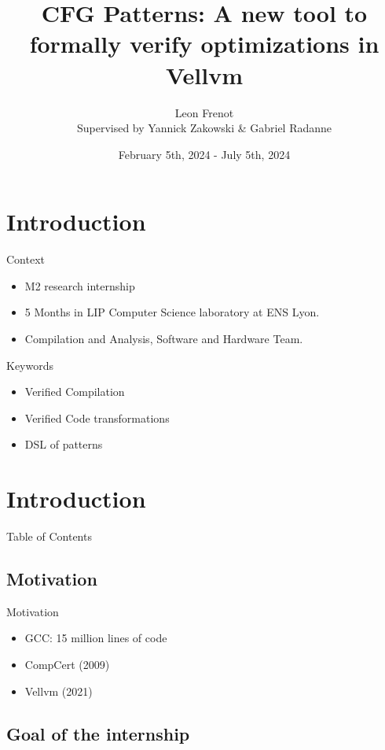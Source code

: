 \documentclass{beamer}
\title{CFG Patterns: A new tool to formally verify optimizations in Vellvm}
\author[Léon Frenot]{Leon Frenot\\ Supervised by Yannick Zakowski \& Gabriel Radanne}
\date[July 12th, 2024]{February 5th, 2024 - July 5th, 2024}
\begin{document}
\frame{\titlepage}

\section*{Introduction}

\begin{frame}
  \begin{block}{Context}
    \begin{itemize}
      \item M2 research internship
      \item 5 Months in LIP Computer Science laboratory at ENS Lyon.
      \item Compilation and Analysis, Software and Hardware Team.
    \end{itemize}
  \end{block}
  \begin{block}{Keywords}
    \begin{itemize}
      \item Verified Compilation
      \item Verified Code transformations
      \item DSL of patterns
    \end{itemize}
  \end{block}
\end{frame}

\section{Introduction}

\begin{frame}{Table of Contents}
  \tableofcontents
\end{frame}

\subsection*{Motivation}

\begin{frame}{Motivation}
  \begin{itemize}
    \item GCC\@: 15 million lines of code
    \item CompCert (2009)
    \item Vellvm (2021)
  \end{itemize}
\end{frame}

\subsection*{Goal of the internship}
\end{document}

